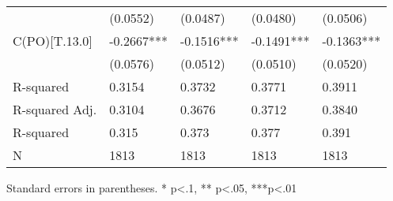 \begin{table}
\begin{center}
\begin{tabular}{lllll}
                         & (0.0552)   & (0.0487)   & (0.0480)   & (0.0506)    \\
C(PO)[T.13.0]            & -0.2667*** & -0.1516*** & -0.1491*** & -0.1363***  \\
                         & (0.0576)   & (0.0512)   & (0.0510)   & (0.0520)    \\
R-squared                & 0.3154     & 0.3732     & 0.3771     & 0.3911      \\
R-squared Adj.           & 0.3104     & 0.3676     & 0.3712     & 0.3840      \\
R-squared                & 0.315      & 0.373      & 0.377      & 0.391       \\
N                        & 1813       & 1813       & 1813       & 1813        \\
\hline
\end{tabular}
\end{center}
\end{table}
\bigskip
Standard errors in parentheses. \newline 
* p<.1, ** p<.05, ***p<.01